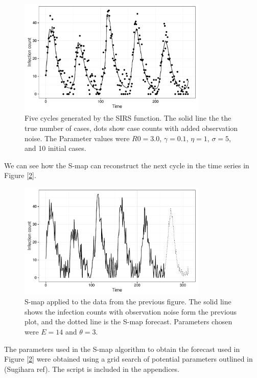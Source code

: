 	\begin{figure}
        \centering
        \captionsetup{width=.8\linewidth}
        \includegraphics[width=0.8\textwidth]{./images/dataplot.pdf}
        \caption{Five cycles generated by the SIRS function. The solid line the the true number of cases, dots show case counts with added observation noise. The Parameter values were $R0 = 3.0$, $\gamma = 0.1$, $\eta = 1$, $\sigma = 5$, and 10 initial cases. \label{dataplot}}
    \end{figure}

    We can see how the S-map can reconstruct the next cycle in the time series in Figure [\ref{smap_project}].

    \begin{figure}[H]
        \centering
        \captionsetup{width=.8\linewidth}
        \includegraphics[width=0.8\textwidth]{./images/smap-project.pdf}
        \caption{S-map applied to the data from the previous figure. The solid line shows the infection counts with observation noise form the previous plot, and the dotted line is the S-map forecast. Parameters chosen were $E = 14$ and $\theta = 3$. \label{smap_project}}
    \end{figure}

    The parameters used in the S-map algorithm to obtain the forecast used in Figure [\ref{smap_project}] were obtained using a grid search of potential parameters outlined in (Sugihara ref). The script is included in the appendices.



